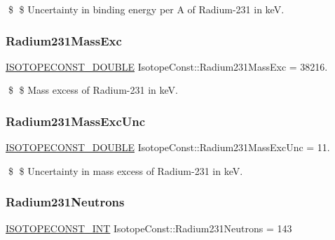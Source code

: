 \$ \$ Uncertainty in binding energy per A of Radium-\/231 in keV. \mbox{\label{group___isotope_const-_radium-_ra231_ga8d3a6b69b1f1dfff138e9bf44949160e}} 
\subsubsection{\texorpdfstring{Radium231\+Mass\+Exc}{Radium231MassExc}}
{\footnotesize\ttfamily \mbox{\hyperlink{group___isotope_const-_macros_ga8f45a7272ce02c0b4c65c44636ed719a}{I\+S\+O\+T\+O\+P\+E\+C\+O\+N\+S\+T\+\_\+\+D\+O\+U\+B\+LE}} Isotope\+Const\+::\+Radium231\+Mass\+Exc = 38216.}

\$ \$ Mass excess of Radium-\/231 in keV. \mbox{\label{group___isotope_const-_radium-_ra231_ga308f890683247c512c05dbcb0aacba88}} 
\subsubsection{\texorpdfstring{Radium231\+Mass\+Exc\+Unc}{Radium231MassExcUnc}}
{\footnotesize\ttfamily \mbox{\hyperlink{group___isotope_const-_macros_ga8f45a7272ce02c0b4c65c44636ed719a}{I\+S\+O\+T\+O\+P\+E\+C\+O\+N\+S\+T\+\_\+\+D\+O\+U\+B\+LE}} Isotope\+Const\+::\+Radium231\+Mass\+Exc\+Unc = 11.}

\$ \$ Uncertainty in mass excess of Radium-\/231 in keV. \mbox{\label{group___isotope_const-_radium-_ra231_ga6139436b24b223ab5df8e7bbd973439a}} 
\subsubsection{\texorpdfstring{Radium231\+Neutrons}{Radium231Neutrons}}
{\footnotesize\ttfamily \mbox{\hyperlink{group___isotope_const-_macros_ga5f18360b3e99483a35c32d789e62621c}{I\+S\+O\+T\+O\+P\+E\+C\+O\+N\+S\+T\+\_\+\+I\+NT}} Isotope\+Const\+::\+Radium231\+Neutrons = 143}


